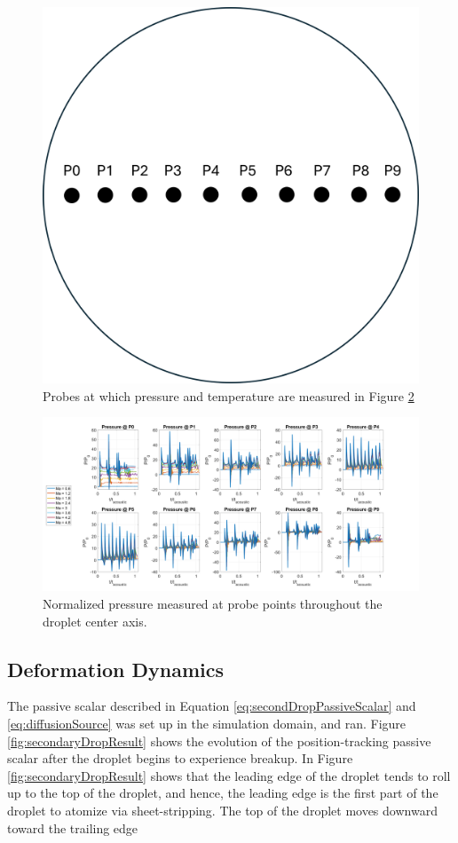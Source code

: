 \documentclass{UCF_ETD}
\begin{document}
\begin{figure}
    \centering
    \includegraphics[width=0.5\linewidth]{Figures/probes_points.png}
    \caption{Probes at which pressure and temperature are measured in Figure \ref{fig:pressure_mach_sweep}}
    \label{fig:point_probes}
\end{figure}

\begin{landscape}
    \begin{figure}
        \centering
        \includegraphics[width=\textwidth,height=\textheight,keepaspectratio]{Figures/pressures_Mach_sweep.png}
        \caption{Normalized pressure measured at probe points throughout the droplet center axis.}
        \label{fig:pressure_mach_sweep}
    \end{figure}
\end{landscape}

\subsection{Deformation Dynamics}
\label{subsec:secondaryDropResults}
The passive scalar described in Equation \ref{eq:secondDropPassiveScalar} and \ref{eq:diffusionSource} was set up in the simulation domain, and ran. Figure \ref{fig:secondaryDropResult} shows the evolution of the position-tracking passive scalar after the droplet begins to experience breakup. 
In Figure \ref{fig:secondaryDropResult} shows that the leading edge of the droplet tends to roll up to the top of the droplet, and hence, the leading edge is the first part of the droplet to atomize via sheet-stripping. The top of the droplet moves downward toward the trailing edge
\end{document}
